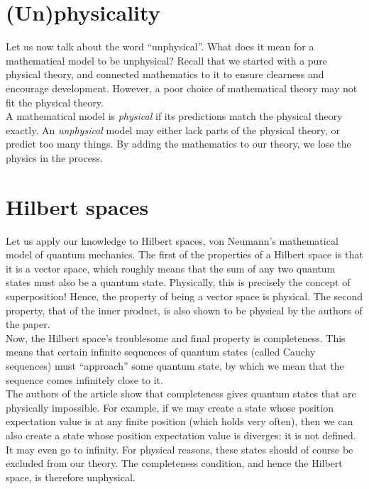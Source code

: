 \documentclass[12pt]{article}
\begin{document}
\begin{multicols}{2}
    \section*{(Un)physicality}
    Let us now talk about the word ``unphysical''. What does it mean for a mathematical model to be unphysical? Recall that we started with a pure physical theory, and connected mathematics to it to ensure clearness and encourage development. However, a poor choice of mathematical theory may not fit the physical theory.\\
    A mathematical model is \textit{physical} if its predictions match the physical theory exactly. An \textit{unphysical} model may either lack parts of the physical theory, or predict too many things. By adding the mathematics to our theory, we lose the physics in the process.
    \section*{Hilbert spaces}
    Let us apply our knowledge to Hilbert spaces, von Neumann's mathematical model of quantum mechanics. The first of the properties of a Hilbert space is that it is a vector space, which roughly means that the sum of any two quantum states must also be a quantum state. Physically, this is precisely the concept of superposition! Hence, the property of being a vector space is physical. The second property, that of the inner product, is also shown to be physical by the authors of the paper.\\
    Now, the Hilbert space's troublesome and final property is completeness. This means that certain infinite sequences of quantum states (called Cauchy sequences) must ``approach'' some quantum state, by which we mean that the sequence comes infinitely close to it.\\
    The authors of the article show that completeness gives quantum states that are physically impossible. For example, if we may create a state whose position expectation value is at any finite position (which holds very often), then we can also create a state whose position expectation value is diverges: it is not defined. It may even go to infinity. For physical reasons, these states should of course be excluded from our theory. The completeness condition, and hence the Hilbert space, is therefore unphysical. 

\end{multicols}
\end{document}
